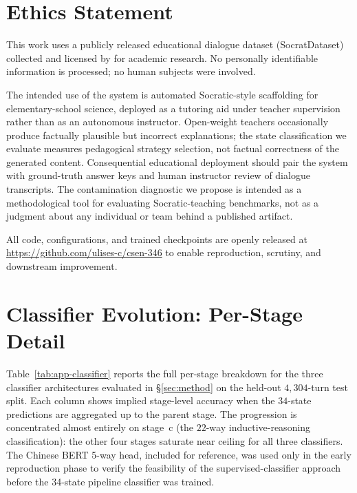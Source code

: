 \documentclass[11pt]{article}
\begin{document}
\section*{Ethics Statement}

This work uses a publicly released educational dialogue dataset (SocratDataset) collected and licensed by \citet{peng2025kele} for academic research. No personally identifiable information is processed; no human subjects were involved.

The intended use of the system is automated Socratic-style scaffolding for elementary-school science, deployed as a tutoring aid under teacher supervision rather than as an autonomous instructor. Open-weight teachers occasionally produce factually plausible but incorrect explanations; the state classification we evaluate measures pedagogical strategy selection, not factual correctness of the generated content. Consequential educational deployment should pair the system with ground-truth answer keys and human instructor review of dialogue transcripts. The contamination diagnostic we propose is intended as a methodological tool for evaluating Socratic-teaching benchmarks, not as a judgment about any individual or team behind a published artifact.

All code, configurations, and trained checkpoints are openly released at \url{https://github.com/ulises-c/csen-346} to enable reproduction, scrutiny, and downstream improvement.



\appendix

\section{Classifier Evolution: Per-Stage Detail}
\label{app:classifier}

Table~\ref{tab:app-classifier} reports the full per-stage breakdown for the three classifier architectures evaluated in \S\ref{sec:method} on the held-out $4{,}304$-turn test split. Each column shows implied stage-level accuracy when the $34$-state predictions are aggregated up to the parent stage. The progression is concentrated almost entirely on stage~c (the $22$-way inductive-reasoning classification): the other four stages saturate near ceiling for all three classifiers. The Chinese BERT 5-way head, included for reference, was used only in the early reproduction phase to verify the feasibility of the supervised-classifier approach before the 34-state pipeline classifier was trained.
\end{document}
